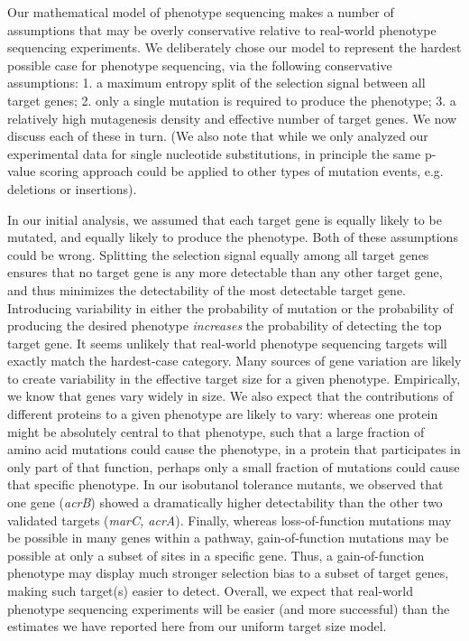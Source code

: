 \documentclass[letterpaper,10pt,english]{howto}
\begin{document}
Our mathematical model of phenotype sequencing makes a number of
assumptions that may be overly conservative relative to real-world
phenotype sequencing experiments.  We deliberately chose our model
to represent the hardest possible case for phenotype sequencing,
via the following conservative assumptions:
1. a maximum entropy split of the selection signal between all target genes;
2. only a single mutation is required to produce the phenotype;
3. a relatively high mutagenesis density and effective number
of target genes.
We now discuss each of these in turn.
(We also note that while we only analyzed our experimental data for single
nucleotide substitutions, in principle the same p-value scoring
approach could be applied to other types of mutation
events, e.g. deletions or insertions).

In our initial analysis, we assumed that each target
gene is equally likely to be mutated, and
equally likely to produce the phenotype.  Both of these assumptions
could be wrong.
Splitting the selection signal equally among all target genes
ensures that no target gene is any more
detectable than any other target gene, and thus minimizes
the detectability of the most detectable target gene.  Introducing
variability in either the probability of mutation or the probability
of producing the desired phenotype \emph{increases} the probability
of detecting the top target gene.  It seems unlikely that real-world
phenotype sequencing targets will exactly match the hardest-case category.
Many sources of gene variation are likely to create variability
in the effective target size for a given phenotype.
Empirically, we know that genes vary widely in size.  We also
expect that the contributions of different proteins to a given phenotype
are likely to vary: whereas one protein might be absolutely central
to that phenotype, such that a large fraction of amino acid mutations
could cause the phenotype, in a protein that participates in
only part of that function, perhaps only a small fraction of mutations
could cause that specific phenotype.  In our isobutanol tolerance
mutants, we observed that one gene (\emph{acrB}) showed a dramatically
higher detectability than the other two validated targets (\emph{marC, acrA}).
Finally, whereas loss-of-function mutations may be possible
in many genes within a pathway, gain-of-function mutations
may be possible at only a subset of sites in a specific gene.
Thus, a gain-of-function phenotype may display much stronger
selection bias to a subset of target genes, making such target(s) easier
to detect.  Overall, we expect that real-world phenotype sequencing
experiments will be easier (and more successful) than the estimates
we have reported here from our uniform target size model.
\end{document}
